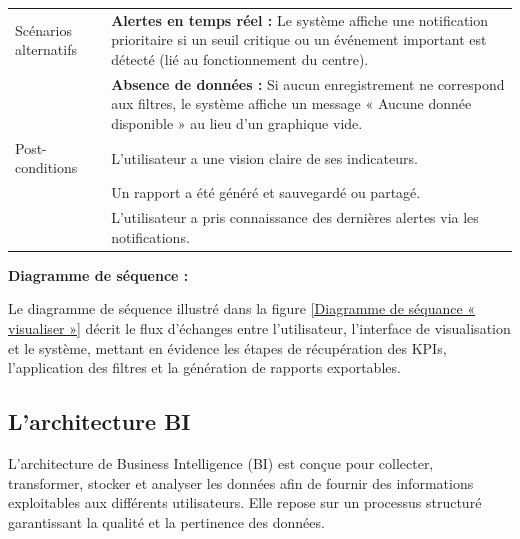 {\begin{longtable}{|l|p{12cm}|}
Scénarios alternatifs &
\textbf{Alertes en temps réel :} Le système affiche une notification prioritaire si un seuil critique ou un événement important est détecté (lié au fonctionnement du centre). \\
& \textbf{Absence de données :} Si aucun enregistrement ne correspond aux filtres, le système affiche un message « Aucune donnée disponible » au lieu d'un graphique vide. \\
\hline

Post-conditions &
L'utilisateur a une vision claire de ses indicateurs. \\
& Un rapport a été généré et sauvegardé ou partagé. \\
& L'utilisateur a pris connaissance des dernières alertes via les notifications. \\
\hline
\end{longtable}
}

\vspace{0.8cm}
\noindent\textbf{Diagramme de séquence :}

\noindent Le diagramme de séquence illustré dans la figure \ref{Diagramme de séquance « visualiser »} décrit le flux d'échanges entre l'utilisateur, l'interface de visualisation et le système, mettant en évidence les étapes de récupération des KPIs, l'application des filtres et la génération de rapports exportables. 

\vspace{0.3cm}

\subsection{L'architecture BI}
L'architecture de Business Intelligence (BI) est conçue pour collecter, transformer, stocker et analyser les données afin de fournir des informations exploitables aux différents utilisateurs. Elle repose sur un processus structuré garantissant la qualité et la pertinence des données.


